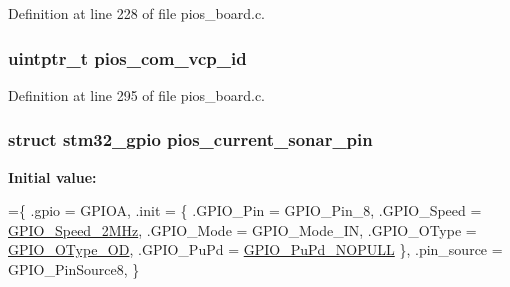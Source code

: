 Definition at line 228 of file pios\-\_\-board.\-c.

\hypertarget{group___open_pilot_core_gaaeb3e0d65ed5c6e7b921c54e1ad905db}{
\subsubsection[{pios\-\_\-com\-\_\-vcp\-\_\-id}]{\setlength{\rightskip}{0pt plus 5cm}uintptr\-\_\-t pios\-\_\-com\-\_\-vcp\-\_\-id}}\label{group___open_pilot_core_gaaeb3e0d65ed5c6e7b921c54e1ad905db}


Definition at line 295 of file pios\-\_\-board.\-c.

\hypertarget{group___open_pilot_core_ga606e58ec5cbb14b404f825ca313fb71e}{
\subsubsection[{pios\-\_\-current\-\_\-sonar\-\_\-pin}]{\setlength{\rightskip}{0pt plus 5cm}struct {\bf stm32\-\_\-gpio} pios\-\_\-current\-\_\-sonar\-\_\-pin}}\label{group___open_pilot_core_ga606e58ec5cbb14b404f825ca313fb71e}
{\bfseries Initial value\-:}
\begin{DoxyCode}
=\{
    .gpio = GPIOA,
                        .init = \{
                                .GPIO\_Pin = GPIO\_Pin\_8,
                                .GPIO\_Speed = \hyperlink{group___output___maximum__frequency__enumeration_ga062ad92b67b4a1f301c161022cf3ba8ea9bff9e174639332007c914483361be18}{GPIO\_Speed\_2MHz},
                                .GPIO\_Mode  = GPIO\_Mode\_IN,
                                .GPIO\_OType = \hyperlink{group___output__type__enumeration_gae74212e8d66c389f47326b06bdf6d2aba1e3717d7271e0707f559a149a1963e43}{GPIO\_OType\_OD},
                                .GPIO\_PuPd  = \hyperlink{group___configuration___pull-_up___pull-_down__enumeration_gafb7ecd99c44b4fd702d669304a36c2c8a013a40bdeb6b3f43e02f8e4da896ba51}{GPIO\_PuPd\_NOPULL}
                        \},
                        .pin\_source = GPIO\_PinSource8,
\}
\end{DoxyCode}


